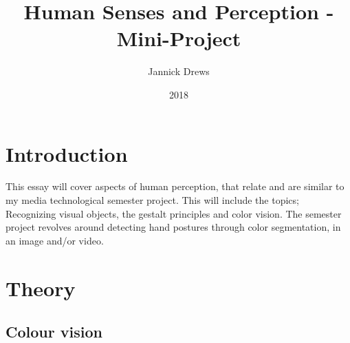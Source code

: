 \documentclass{article}
\title{Human Senses and Perception - Mini-Project}
\author{Jannick Drews}
\date{2018}
\begin{document}
\thispagestyle{empty} %
\maketitle
\newpage
\thispagestyle{empty} %
\tableofcontents%
\newpage %

\section{Introduction}
\label{sec:Introduction}
This essay will cover aspects of human perception, that relate and are similar to my media technological semester project. This will include the topics; Recognizing visual objects, the gestalt principles and color vision. The semester project revolves around detecting hand postures through color segmentation, in an image and/or video.
\section{Theory}
\label{sec:Theory}

\subsection{Colour vision} %
\end{document}

